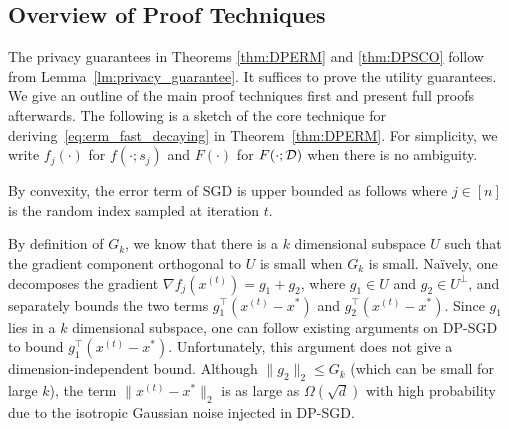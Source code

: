 \subsection{Overview of Proof Techniques}\label{sec:proof_technique}
The privacy guarantees in Theorems \ref{thm:DPERM} and \ref{thm:DPSCO} follow from Lemma~\ref{lm:privacy_guarantee}.
It suffices to prove the utility guarantees. 
We give an outline of the main proof techniques first and present full proofs afterwards.
The following is a sketch of the core technique for deriving~\eqref{eq:erm_fast_decaying} in Theorem~\ref{thm:DPERM}.
For simplicity, we write $f_j(\cdot)$ for $f(\cdot;s_j)$ and $F(\cdot)$ for $F(\cdot;\mathcal D)$ when there is no ambiguity.

By convexity, the error term of SGD is upper bounded as follows
where $j \in [n]$ is the random index sampled at iteration $t$.

By definition of $G_{k}$, we know that there is a $k$ dimensional
subspace $U$ such that the gradient component orthogonal to $U$ is small when $G_k$ is small.
Na\"ively, one decomposes the gradient $\nabla f_{j}(x^{(t)})=g_{1}+g_{2}$,
where $g_{1}\in U$ and $g_{2}\in U^{\perp}$,
and separately bounds the two terms $g_1^\top (x^{(t)}-x^{*})$ and $g_2^\top (x^{(t)}-x^{*})$.
Since $g_{1}$ lies in a $k$ dimensional subspace, one can follow existing
arguments on DP-SGD to bound $g_{1}^{\top}(x^{(t)}-x^{*})$. 
Unfortunately, this argument does not give a dimension-independent bound.
Although
$\|g_{2}\|_{2}\leq G_{k}$ (which can be small for large $k$), the term
$\|x^{(t)}-x^{*}\|_{2}$ is as large as $\Omega(\sqrt{d})$ with high probability due
to the isotropic Gaussian noise injected in DP-SGD. 


